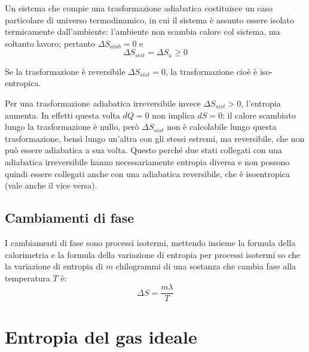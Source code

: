 \documentclass[class=book, crop=false, oneside, 12pt]{standalone}
\begin{document}
Un sistema che compie una trasformazione adiabatica costituisce un caso particolare di universo termodinamico, in cui il sistema è assunto essere isolato termicamente dall'ambiente: l'ambiente non scambia calore col sistema, ma soltanto lavoro; pertanto \(\Delta S_{amb} = 0\) e 
\begin{equation*}
    \Delta S_{sist} = \Delta S_u \geq 0 
\end{equation*}

Se la trasformazione è reversibile \(\Delta S_{sist} = 0\), la trasformazione cioè è iso-entropica.

Per una trasformazione adiabatica irreversibile invece \(\Delta S_{sist}> 0 \), l'entropia aumenta. 
In effetti questa volta \(d Q =0\) non implica \(d S =0\): il calore scambiato lungo la trasformazione è nullo, però \(\Delta S_{sist}\) non è calcolabile lungo questa trasformazione, bensì lungo un'altra con gli stessi estremi, ma reversibile, che non può essere adiabatica a sua volta. 
Questo perché due stati collegati con una adiabatica irreversibile hanno necessariamente entropia diversa e non possono quindi essere collegati anche con una adiabatica reversibile, che è isoentropica (vale anche il vice versa).

\subsection{Cambiamenti di fase}

I cambiamenti di fase sono processi isotermi, mettendo insieme la formula della calorimetria e la formula della variazione di entropia per processi isotermi so che la variazione di entropia di \(m\) chilogrammi di una sostanza che cambia fase alla temperatura \(T\) è:
\begin{equation}
    \Delta S = \frac{m \lambda}{T}
\end{equation}

\section{Entropia del gas ideale}
\end{document}

